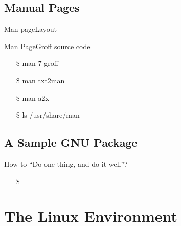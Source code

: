 \subsection{Manual Pages}
\label{sec:manual-pages}

\begin{frame}{Man page}{Layout}
  \begin{center}
  \end{center}
\end{frame}

\begin{frame}{Man Page}{Groff source code}
  \begin{minipage}[b]{.6\linewidth}
    \begin{center}
    \end{center}
  \end{minipage}
  \begin{minipage}[b]{.35\linewidth}\ttfamily
    \begin{itemize}
    \item[\$] man 7 groff
    \item[\$] man txt2man
    \item[\$] man a2x
    \item[\$] ls /usr/share/man
    \end{itemize}
  \end{minipage}
\end{frame}

\subsection{A Sample GNU Package}
\label{sec:sample-gnu-package}

\begin{frame}{How to ``Do one thing, and do it well''?}  
  \begin{itemize}
  \item[\$] 
  \end{itemize}
\end{frame}

\section{The Linux Environment}
\label{sec:linux-environment}

